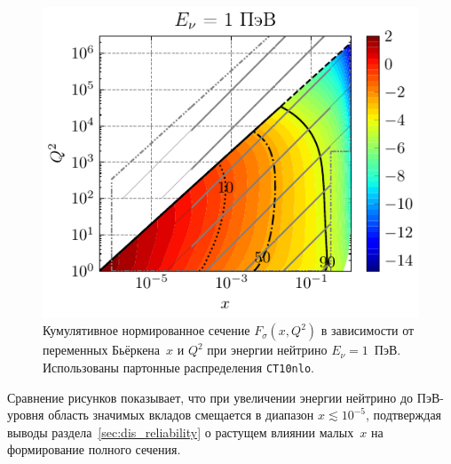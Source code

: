 \begin{figure}[!h]
\centering
\includegraphics[width=0.8\linewidth]{images/NuProp/cdfxq2_cc_proton_CT10nlo_14_1000000.pdf}
\caption{Кумулятивное нормированное сечение $F_{\sigma}(x,Q^2)$ в зависимости от переменных Бьёркена~$x$ и $Q^2$ при энергии нейтрино $E_{\nu} = 1$~ПэВ. Использованы партонные распределения \texttt{CT10nlo}.}
\label{Pp6}
\end{figure}

Сравнение рисунков показывает, что при увеличении энергии нейтрино до ПэВ-уровня область значимых вкладов смещается в диапазон $x \lesssim 10^{-5}$, подтверждая выводы раздела~\ref{sec:dis_reliability} о растущем влиянии малых~$x$ на формирование полного сечения.
